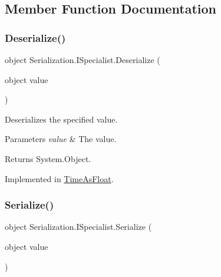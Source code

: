 \subsection{Member Function Documentation}
\mbox{\label{interface_serialization_1_1_i_specialist_a90d5a229aacd71121934630932df0f1a}} 
\subsubsection{\texorpdfstring{Deserialize()}{Deserialize()}}
{\footnotesize\ttfamily object Serialization.\+I\+Specialist.\+Deserialize (\begin{DoxyParamCaption}\item[{object}]{value }\end{DoxyParamCaption})}



Deserializes the specified value. 


\begin{DoxyParams}{Parameters}
{\em value} & The value.\\
\hline
\end{DoxyParams}
\begin{DoxyReturn}{Returns}
System.\+Object.
\end{DoxyReturn}


Implemented in \hyperlink{class_time_as_float_a5f464ebb741e90aae50b8fdffe49b022}{Time\+As\+Float}.

\mbox{\label{interface_serialization_1_1_i_specialist_adf11f6ab173de9fe3c26e3cbee292c92}} 
\subsubsection{\texorpdfstring{Serialize()}{Serialize()}}
{\footnotesize\ttfamily object Serialization.\+I\+Specialist.\+Serialize (\begin{DoxyParamCaption}\item[{object}]{value }\end{DoxyParamCaption})}



